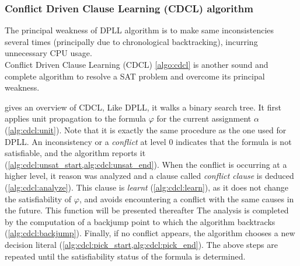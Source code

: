 %
%
\subsubsection{Conflict Driven Clause Learning (CDCL) algorithm}

The principal weakness of DPLL algorithm is to make same inconsistencies several times
(principally due to chronological backtracking), incurring unnecessary CPU usage.\\
Conflict Driven Clause Learning (CDCL) \cref{algo:cdcl} is another sound and complete algorithm
to resolve a SAT problem and overcome its principal weakness.


 gives an overview of CDCL, Like DPLL,  it walks a binary search tree.
It first applies unit propagation to the formula $\varphi$ for the current assignment $\alpha$ (\cref{alg:cdcl:unit}).
Note that it is exactly the same procedure as the one used for DPLL.
An inconsistency or a \emph{conflict} at level $0$ indicates that the formula is not satisfiable, and the algorithm
reports it (\cref{alg:cdcl:unsat_start,alg:cdcl:unsat_end}). When the conflict is occurring at a higher level, it
reason was analyzed and a clause called \emph{conflict clause} is deduced (\cref{alg:cdcl:analyze}).
 This clause is \emph{learnt} (\cref{alg:cdcl:learn}), as it does not change the
satisfiability of $\varphi$, and avoids encountering a conflict with the same
causes in the future. This function will be presented thereafter
The analysis is completed by the computation of a backjump point to which the algorithm backtracks (\cref{alg:cdcl:backjump}).
Finally, if no conflict appears, the algorithm chooses a new decision literal 
(\cref{alg:cdcl:pick_start,alg:cdcl:pick_end}).
The above steps are repeated until the satisfiability status of the
formula is determined.





